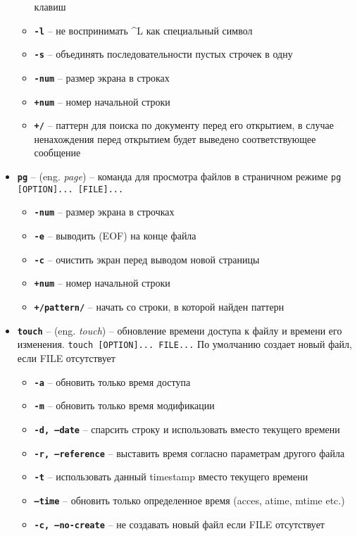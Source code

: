 \documentclass[12pt, a4paper]{article}
\begin{document}
\begin{itemize}
\begin{itemize}
      клавиш
    \item \textbf{\texttt{-l}} -- не воспринимать \textasciicircum L как
      специальный символ
    \item \textbf{\texttt{-s}} -- объединять последовательности пустых строчек
      в одну
    \item \textbf{\texttt{-num}} -- размер экрана в строках
    \item \textbf{\texttt{+num}} -- номер начальной строки
    \item \textbf{\texttt{+/}} -- паттерн для поиска по документу перед его
      открытием, в случае ненахождения перед открытием будет выведено
      соответствующее сообщение
  \end{itemize}
  \item \textbf{\texttt{pg}} -- (eng. \textit{page}) -- команда для просмотра
    файлов в страничном режиме \texttt{pg [OPTION]... [FILE]...}
  \begin{itemize}
    \item \textbf{\texttt{-num}} -- размер экрана в строчках
    \item \textbf{\texttt{-e}} -- выводить (EOF) на конце файла
    \item \textbf{\texttt{-c}} -- очистить экран перед выводом новой страницы
    \item \textbf{\texttt{+num}} -- номер начальной строки
    \item \textbf{\texttt{+/pattern/}} -- начать со строки, в которой найден
      паттерн
  \end{itemize}
  \item \textbf{\texttt{touch}} -- (eng. \textit{touch}) -- обновление времени
    доступа к файлу и времени его изменения. \texttt{touch [OPTION]... FILE...}
    По умолчанию создает новый файл, если FILE отсутствует
    \begin{itemize}
      \item \textbf{\texttt{-a}} -- обновить только время доступа
      \item \textbf{\texttt{-m}} -- обновить только время модификации
      \item \textbf{\texttt{-d, --date}} -- спарсить строку и использовать
        вместо текущего времени
      \item \textbf{\texttt{-r, --reference}} -- выставить время согласно
        параметрам другого файла
      \item \textbf{\texttt{-t}} -- использовать данный timestamp вместо
        текущего времени
      \item \textbf{\texttt{--time}} -- обновить только определенное время
        (acces, atime, mtime etc.)
      \item \textbf{\texttt{-c, --no-create}} -- не создавать новый файл если
        FILE отсутствует
    \end{itemize}
\end{itemize}
\end{document}
